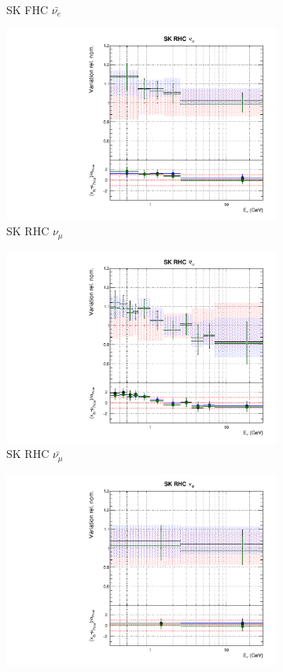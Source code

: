 \begin{figure}[!htbp]
\begin{subfigure}{0.45\textwidth}
  \caption{SK FHC $\bar{\nu_{e}}$}
\end{subfigure}
\begin{subfigure}{0.45\textwidth}
  \centering
  \includegraphics[width=0.75\linewidth]{figs/polydataflux_12}
  \caption{SK RHC $\nu_{\mu}$}
\end{subfigure}
\begin{subfigure}{0.45\textwidth}
  \centering
  \includegraphics[width=0.75\linewidth]{figs/polydataflux_13}
  \caption{SK RHC $\bar{\nu_{\mu}}$}
\end{subfigure}
\begin{subfigure}{0.45\textwidth}
  \centering
  \includegraphics[width=0.75\linewidth]{figs/polydataflux_14}

\end{subfigure}
\end{figure}
